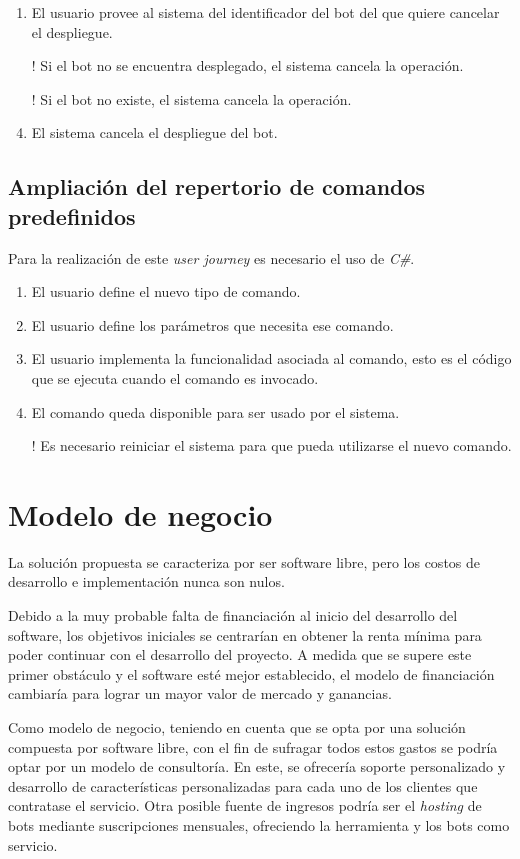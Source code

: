 \begin{enumerate}
	\item El usuario provee al sistema del identificador del bot del que quiere cancelar el despliegue.
	\item[!] Si el bot no se encuentra desplegado, el sistema cancela la operación.
	\item[!] Si el bot no existe, el sistema cancela la operación.
	\item El sistema cancela el despliegue del bot.
\end{enumerate}


\subsection{Ampliación del repertorio de comandos predefinidos}

Para la realización de este \textit{user journey} es necesario el uso de \textit{C\#}.

\begin{enumerate}
	\item El usuario define el nuevo tipo de comando.
	\item El usuario define los parámetros que necesita ese comando.
	\item El usuario implementa la funcionalidad asociada al comando, esto es el código que se ejecuta cuando el comando es invocado.
	\item El comando queda disponible para ser usado por el sistema.
	\item[!] Es necesario reiniciar el sistema para que pueda utilizarse el nuevo comando.
\end{enumerate}

\section{Modelo de negocio}

La solución propuesta se caracteriza por ser software libre, pero los costos de desarrollo e implementación nunca son nulos.

Debido a la muy probable falta de financiación al inicio del desarrollo del software, los objetivos iniciales se centrarían en obtener la renta mínima para poder continuar con el desarrollo del proyecto. A medida que se supere este primer obstáculo y el software esté mejor establecido, el modelo de financiación cambiaría para lograr un mayor valor de mercado y ganancias.

Como modelo de negocio, teniendo en cuenta que se opta por una solución compuesta por software libre, con el fin de sufragar todos estos gastos se podría optar por un modelo de consultoría. En este, se ofrecería soporte personalizado y desarrollo de características personalizadas para cada uno de los clientes que contratase el servicio. Otra posible fuente de ingresos podría ser el \textit{hosting} de bots mediante suscripciones mensuales, ofreciendo la herramienta y los bots como servicio.

